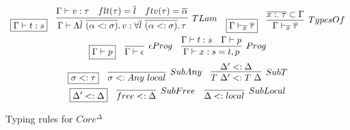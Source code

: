 \documentclass[acmsmall]{acmart}
\newcommand{\mathframebox}[1]{\framebox{$\displaystyle #1$}}
\newcommand{\ap}{~}
\begin{document}
\begin{figure}
\begin{gather*}
{        }\\
        \begin{array}{cccc}
            \mathframebox{\Gamma\vdash t : s} &
            \infer[TLam]{
                \Gamma\vdash\Lambda\overline{l}\ap\overline{(\alpha <: \sigma)}\ldotp v : \forall\overline{l}\ap\overline{(\alpha <: \sigma)}\ldotp\tau
            }{
                \Gamma\vdash v : \tau & flt(\tau) = \overline{l} & ftv(\tau) = \overline{\alpha}
            } &
            \mathframebox{\Gamma\vdash_{\overline{x}}\overline{\tau}}
            &
            \infer[TypesOf]{\Gamma\vdash_{\overline{x}}\overline{\tau}}{\overline{x :_\cdot \tau} \subset \Gamma}
        \end{array} \\
        \begin{array}{ccc}
            \mathframebox{\Gamma\vdash p} &
            \infer[\epsilon Prog]{\Gamma\vdash\epsilon}{} &
            \infer[Prog]{\Gamma\vdash x : s = t, p}{\Gamma\vdash t : s & \Gamma\vdash p}
        \end{array}\\
        \begin{array}{ccc}
            \mathframebox{\sigma <: \tau} &
            \infer[SubAny]{\sigma <: Any\ap local}{} &
            \infer[SubT]{T\ap\Delta' <: T\ap\Delta}{\Delta' <: \Delta}
        \end{array} \\
        \begin{array}{ccc}
            \mathframebox{\Delta' <: \Delta} &
            \infer[SubFree]{free <: \Delta}{} &
            \infer[SubLocal]{\Delta <: local}{}
        \end{array}
    \end{gather*}
    \caption{Typing rules for $Core^{\Delta}$}
    \label{fig:core-delta-typing}
\end{figure}




\end{document}
